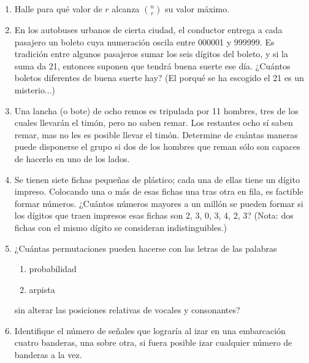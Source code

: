 \begin{Ejer}
\begin{enumerate}
\item Halle para qu\'e valor de $r$ alcanza $\binom{n}{r}$ su valor m\'aximo.

\item En los autobuses urbanos de cierta ciudad, el conductor entrega a cada pasajero un boleto cuya numeraci\'on oscila entre 000001 y 999999. Es tradici\'on entre algunos pasajeros sumar los seis d\'igitos del boleto, y si la suma da 21, entonces suponen que tendr\'a buena suerte ese d\'ia. ¿Cu\'antos boletos diferentes de buena suerte hay? (El porqu\'e se ha escogido el 21 es un misterio...)

\item Una lancha (o bote) de ocho remos es tripulada por 11 hombres, tres de los cuales llevar\'an el tim\'on, pero no saben remar. Los restantes ocho s\'i saben remar, mas no les es posible llevar el tim\'on. Determine de cu\'antas maneras puede disponerse el grupo si dos de los hombres que reman s\'olo son capaces de hacerlo en uno de los lados.

\item Se tienen siete fichas peque\~nas de pl\'astico; cada una de ellas tiene un d\'igito impreso. Colocando una o m\'as de esas fichas una tras otra en fila, es factible formar n\'umeros. ¿Cu\'antos n\'umeros mayores a un mill\'on se pueden formar si los d\'igitos que traen impresos esas fichas son 2, 3, 0, 3, 4, 2, 3? (Nota: dos fichas con el mismo d\'igito se consideran indistinguibles.)

\item ¿Cu\'antas permutaciones pueden hacerse con las letras de las palabras 
\begin{enumerate}
\item probabilidad
\item arpista
\end{enumerate}
sin alterar las posiciones relativas de vocales y consonantes?



\item Identifique el n\'umero de se\~nales que lograr\'ia al izar en una embarcaci\'on cuatro banderas, una sobre otra, si fuera posible izar cualquier n\'umero de banderas a la vez.


\end{enumerate}
\end{Ejer}
